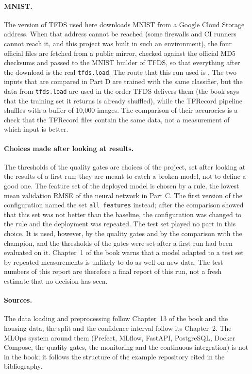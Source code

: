 \paragraph{MNIST.} The version of TFDS used here downloads MNIST from a Google Cloud Storage address. When that address cannot be reached (some firewalls and CI runners cannot reach it, and this project was built in such an environment), the four official files are fetched from a public mirror, checked against the official MD5 checksums and passed to the MNIST builder of TFDS, so that everything after the download is the real \texttt{tfds.load}. The route that this run used is \texttt{}. The two inputs that are compared in Part D are trained with the same classifier, but the data from \texttt{tfds.load} are used in the order TFDS delivers them (the book says that the training set it returns is already shuffled), while the TFRecord pipeline shuffles with a buffer of 10,000 images. The comparison of their accuracies is a check that the TFRecord files contain the same data, not a measurement of which input is better.

\paragraph{Choices made after looking at results.} The thresholds of the quality gates are choices of the project, set after looking at the results of a first run; they are meant to catch a broken model, not to define a good one. The feature set of the deployed model is chosen by a rule, the lowest mean validation RMSE of the neural network in Part C. The first version of the configuration named the set \texttt{all features} instead; after the comparison showed that this set was not better than the baseline, the configuration was changed to the rule and the deployment was repeated. The test set played no part in this choice. It is used, however, by the quality gates and by the comparison with the champion, and the thresholds of the gates were set after a first run had been evaluated on it. Chapter~1 of the book warns that a model adapted to a test set by repeated measurements is unlikely to do as well on new data. The test numbers of this report are therefore a final report of this run, not a fresh estimate that no decision has seen.

\paragraph{Sources.} The data loading and preprocessing follow Chapter~13 of the book and the housing data, the split and the confidence interval follow its Chapter~2. The MLOps system around them (Prefect, MLflow, FastAPI, PostgreSQL, Docker Compose, the quality gates, the monitoring and the continuous integration) is not in the book; it follows the structure of the example repository cited in the bibliography.

